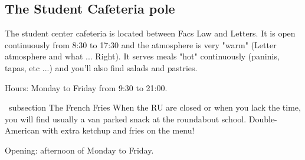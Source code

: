 \subsection {The Student Cafeteria pole}


The student center cafeteria is located between Facs Law and Letters.
It is open continuously from 8:30 to 17:30 and the atmosphere is very "warm" (Letter atmosphere and what ... Right).
It serves meals "hot" continuously (paninis, tapas, etc ...) and you'll also find salads and pastries.

Hours: Monday to Friday from 9:30 to 21:00.





\ subsection {The French Fries}
When the RU are closed or when you lack the time, you will find usually a van parked snack at the roundabout school.
Double-American with extra ketchup and fries on the menu!

Opening: afternoon of Monday to Friday.


